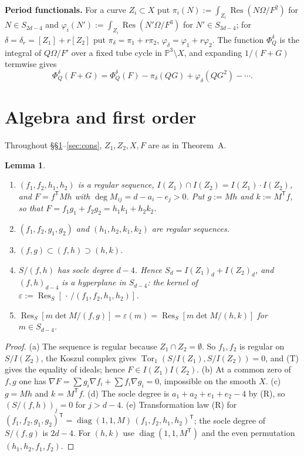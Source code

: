 \documentclass[11pt]{article}
\numberwithin{equation}{section}
\newtheorem{lemma}[theorem]{Lemma}
\theoremstyle{remark}
\newcommand{\PP}{\mathbb{P}}
\newcommand{\Res}{\operatorname{Res}}
\newcommand{\run}[1]{\medskip\noindent\textbf{#1}}
\begin{document}
\run{Period functionals.} For a curve $Z_i\subset X$ put $\pi_i(N):=\int_{Z_i}\Res(N\Omega/F^2)$ for
$N\in S_{2d-4}$ and $\varphi_i(N'):=\int_{Z_i}\Res(N'\Omega/F^3)$ for $N'\in S_{3d-4}$; for
$\delta=\delta_r=[Z_1]+r[Z_2]$ put $\pi_\delta=\pi_1+r\pi_2$, $\varphi_\delta=\varphi_1+r\varphi_2$. The function
$\Phi^\delta_Q$ is the integral of $Q\Omega/F'$ over a fixed tube cycle in $\PP^3\setminus X$, and expanding
$1/(F+G)$ termwise gives
\begin{equation}\label{eq:exp}
\Phi^\delta_Q(F+G)=\Phi^\delta_Q(F)-\pi_\delta(QG)+\varphi_\delta(QG^2)-\cdots .
\end{equation}

\section{Algebra and first order}\label{sec:first}

Throughout \S\S\ref{sec:first}--\ref{sec:cons}, $Z_1,Z_2,X,F$ are as in Theorem~A.

\begin{lemma}\label{lem:alg}
\begin{enumerate}[label=\textup{(\alph*)}]
\item $(f_1,f_2,h_1,h_2)$ is a regular sequence, $I(Z_1)\cap I(Z_2)=I(Z_1)\cdot I(Z_2)$, and $F=f^{\mathsf T}Mh$
with $\deg M_{ij}=d-a_i-e_j>0$. Put $g:=Mh$ and $k:=M^{\mathsf T}f$, so that $F=f_1g_1+f_2g_2=h_1k_1+h_2k_2$.
\item $(f_1,f_2,g_1,g_2)$ and $(h_1,h_2,k_1,k_2)$ are regular sequences.
\item $(f,g)\subset(f,h)\supset(h,k)$.
\item $S/(f,h)$ has socle degree $d-4$. Hence $S_d=I(Z_1)_d+I(Z_2)_d$, and $(f,h)_{d-4}$ is a hyperplane in
$S_{d-4}$: the kernel of $\varepsilon:=\Res_S[\,\cdot\,/(f_1,f_2,h_1,h_2)]$.
\item $\Res_S[m\det M/(f,g)]=\varepsilon(m)=\Res_S[m\det M/(h,k)]$ for $m\in S_{d-4}$.
\end{enumerate}
\end{lemma}
\begin{proof}
(a) The sequence is regular because $Z_1\cap Z_2=\emptyset$. So $f_1,f_2$ is regular on $S/I(Z_2)$, the Koszul
complex gives $\operatorname{Tor}_1(S/I(Z_1),S/I(Z_2))=0$, and (T) gives the equality of ideals; hence
$F\in I(Z_1)I(Z_2)$. (b) At a common zero of $f,g$ one has $\nabla F=\sum g_i\nabla f_i+\sum f_i\nabla g_i=0$,
impossible on the smooth $X$. (c) $g=Mh$ and $k=M^{\mathsf T}f$. (d) The socle degree is
$a_1+a_2+e_1+e_2-4$ by (R), so $(S/(f,h))_j=0$ for $j>d-4$. (e) Transformation law (R) for
$(f_1,f_2,g_1,g_2)^{\mathsf T}=\operatorname{diag}(1,1,M)\,(f_1,f_2,h_1,h_2)^{\mathsf T}$; the socle degree of
$S/(f,g)$ is $2d-4$. For $(h,k)$ use $\operatorname{diag}(1,1,M^{\mathsf T})$ and the even permutation
$(h_1,h_2,f_1,f_2)$.
\end{proof}
\end{document}
